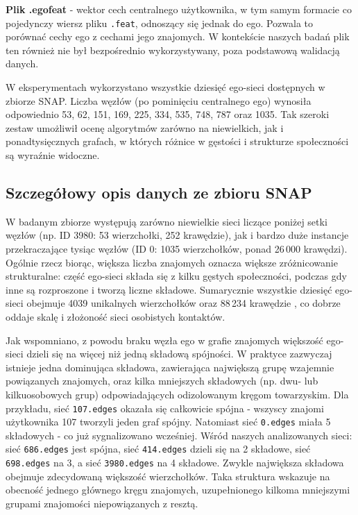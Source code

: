 \textbf{Plik .egofeat} - wektor cech centralnego użytkownika, w tym samym formacie co pojedynczy wiersz pliku \verb|.feat|, odnoszący się jednak do ego. Pozwala to porównać cechy ego z cechami jego znajomych. W kontekście naszych badań plik ten również nie był bezpośrednio wykorzystywany, poza podstawową walidacją danych.

W eksperymentach wykorzystano wszystkie dziesięć ego-sieci dostępnych w zbiorze SNAP. Liczba węzłów (po pominięciu centralnego ego) wynosiła odpowiednio 53, 62, 151, 169, 225, 334, 535, 748, 787 oraz 1035. Tak szeroki zestaw umożliwił ocenę algorytmów zarówno na niewielkich, jak i ponadtysięcznych grafach, w których różnice w gęstości i strukturze społeczności są wyraźnie widoczne.

\subsection{Szczegółowy opis danych ze zbioru SNAP}
W badanym zbiorze występują zarówno niewielkie sieci liczące poniżej setki węzłów (np. ID 3980: 53 wierzchołki, 252 krawędzie), jak i bardzo duże instancje przekraczające tysiąc węzłów (ID 0: 1035 wierzchołków, ponad 26\,000 krawędzi). Ogólnie rzecz biorąc, większa liczba znajomych oznacza większe zróżnicowanie strukturalne: część ego-sieci składa się z kilku gęstych społeczności, podczas gdy inne są rozproszone i tworzą liczne składowe. Sumarycznie wszystkie dziesięć ego-sieci obejmuje 4039 unikalnych wierzchołków oraz 88\,234 krawędzie \cite{McAuley2012}, co dobrze oddaje skalę i złożoność sieci osobistych kontaktów.

Jak wspomniano, z powodu braku węzła ego w grafie znajomych większość ego-sieci dzieli się na więcej niż jedną składową spójności. W praktyce zazwyczaj istnieje jedna dominująca składowa, zawierająca największą grupę wzajemnie powiązanych znajomych, oraz kilka mniejszych składowych (np. dwu- lub kilkuosobowych grup) odpowiadających odizolowanym kręgom towarzyskim. Dla przykładu, sieć \verb|107.edges| okazała się całkowicie spójna - wszyscy znajomi użytkownika 107 tworzyli jeden graf spójny. Natomiast sieć \verb|0.edges| miała 5 składowych - co już sygnalizowano wcześniej. Wśród naszych analizowanych sieci: sieć \verb|686.edges| jest spójna, sieć \verb|414.edges| dzieli się na 2 składowe, sieć \verb|698.edges| na 3, a sieć \verb|3980.edges| na 4 składowe. Zwykle największa składowa obejmuje zdecydowaną większość wierzchołków. Taka struktura wskazuje na obecność jednego głównego kręgu znajomych, uzupełnionego kilkoma mniejszymi grupami znajomości niepowiązanych z resztą.

